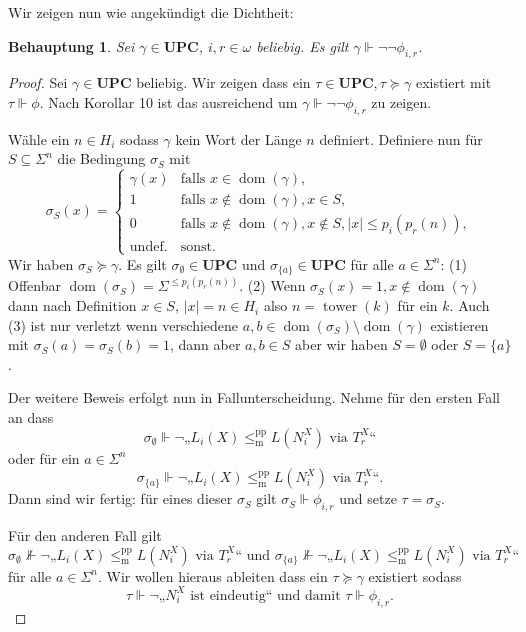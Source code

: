 \documentclass[nofonts]{uebung}
\newtheorem{claim}[theorem]{Behauptung}
\DeclareMathOperator{\dom}{dom}
\def\leqmpp{\ensuremath{\leq_\mathrm{m}^\mathrm{pp}}}
\DeclareMathOperator{\tower}{tower}
\begin{document}
Wir zeigen nun wie angekündigt die Dichtheit:

\begin{claim}
    Sei $\gamma\in\mathbf{UPC}$, $i,r\in\omega$ beliebig. Es gilt $\gamma\Vdash\neg\neg \phi_{i,r}$.
\end{claim}
\begin{proof}
    Sei $\gamma\in\mathbf{UPC}$ beliebig. Wir zeigen dass ein $\tau\in\mathbf{UPC}, \tau\succeq \gamma$ existiert mit $\tau\Vdash\phi$.
    Nach Korollar 10 ist das ausreichend um $\gamma\Vdash\neg\neg \phi_{i,r}$ zu zeigen.

    Wähle ein $n\in H_i$ sodass $\gamma$ kein Wort der Länge $n$ definiert.
    Definiere nun für $S\subseteq\Sigma^n$ die Bedingung $\sigma_S$ mit
    \[ \sigma_S(x)  =\begin{cases}
    \gamma(x) & \text{falls $x\in\dom(\gamma)$},\\
    1 & \text{falls $x\not\in\dom(\gamma), x\in S$},\\
    0 & \text{falls $x\not\in\dom(\gamma), x\not\in S, |x|\leq p_i(p_r(n))$},\\
    \text{undef.} & \text{sonst}.
    \end{cases}
    \]
    Wir haben $\sigma_S\succeq \gamma$.
    Es gilt $\sigma_\emptyset\in\mathbf{UPC}$ und $\sigma_{\{a\}}\in\mathbf{UPC}$ für alle $a\in \Sigma^n$:
    (1) Offenbar $\dom(\sigma_S)=\Sigma^{\leq p_i(p_r(n))}$.
    (2) Wenn $\sigma_S(x)=1,x\not\in\dom(\gamma)$ dann nach Definition $x\in S$, $|x|=n\in H_i$ also $n=\tower(k)$ für ein $k$.
    Auch (3) ist nur verletzt wenn verschiedene $a,b\in\dom(\sigma_S)\setminus\dom(\gamma)$ existieren mit $\sigma_S(a)=\sigma_S(b)=1$, dann aber $a,b\in S$ aber wir haben $S=\emptyset$ oder $S=\{a\}$.

    Der weitere Beweis erfolgt nun in Fallunterscheidung. Nehme für den ersten Fall an dass
    \[ \sigma_\emptyset \Vdash \neg„L_{i}(X)\leqmpp L(N_i^X)\text{ via }T^X_r“ \]
    oder für ein $a\in\Sigma^n$
    \[ \sigma_{\{a\}} \Vdash \neg„L_{i}(X)\leqmpp L(N_i^X)\text{ via }T^X_r“. \]
    Dann sind wir fertig: für eines dieser $\sigma_S$ gilt $\sigma_S\Vdash \phi_{i,r}$ und setze $\tau=\sigma_S$.

    Für den anderen Fall gilt 
    \[ \sigma_\emptyset \not\Vdash \neg„L_{i}(X)\leqmpp L(N_i^X)\text{ via }T^X_r“ \text{ und }\sigma_{\{a\}} \not\Vdash \neg„L_{i}(X)\leqmpp L(N_i^X)\text{ via }T^X_r“ \]
    für alle $a\in\Sigma^n$.
    Wir wollen hieraus ableiten dass ein $\tau\succeq\gamma$ existiert sodass
    \[ \tau\Vdash \neg\text{„$N_i^X$ ist eindeutig“} \text{ und damit } \tau\Vdash\phi_{i,r}. \]


\end{proof}
\end{document}
